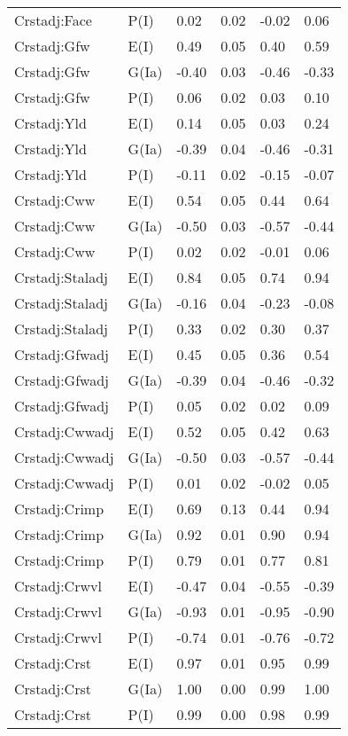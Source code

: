 \begin{center}
\begin{longtable}{|p{1.1in}|p{0.7in}|p{0.7in}|p{0.6in}|p{0.6in}|p{0.6in}|}
  Crstadj:Face & P(I) & 0.02 & 0.02 & -0.02 & 0.06 \\ 
  Crstadj:Gfw & E(I) & 0.49 & 0.05 & 0.40 & 0.59 \\ 
  Crstadj:Gfw & G(Ia) & -0.40 & 0.03 & -0.46 & -0.33 \\ 
  Crstadj:Gfw & P(I) & 0.06 & 0.02 & 0.03 & 0.10 \\ 
  Crstadj:Yld & E(I) & 0.14 & 0.05 & 0.03 & 0.24 \\ 
  Crstadj:Yld & G(Ia) & -0.39 & 0.04 & -0.46 & -0.31 \\ 
  Crstadj:Yld & P(I) & -0.11 & 0.02 & -0.15 & -0.07 \\ 
  Crstadj:Cww & E(I) & 0.54 & 0.05 & 0.44 & 0.64 \\ 
  Crstadj:Cww & G(Ia) & -0.50 & 0.03 & -0.57 & -0.44 \\ 
  Crstadj:Cww & P(I) & 0.02 & 0.02 & -0.01 & 0.06 \\ 
  Crstadj:Staladj & E(I) & 0.84 & 0.05 & 0.74 & 0.94 \\ 
  Crstadj:Staladj & G(Ia) & -0.16 & 0.04 & -0.23 & -0.08 \\ 
  Crstadj:Staladj & P(I) & 0.33 & 0.02 & 0.30 & 0.37 \\ 
  Crstadj:Gfwadj & E(I) & 0.45 & 0.05 & 0.36 & 0.54 \\ 
  Crstadj:Gfwadj & G(Ia) & -0.39 & 0.04 & -0.46 & -0.32 \\ 
  Crstadj:Gfwadj & P(I) & 0.05 & 0.02 & 0.02 & 0.09 \\ 
  Crstadj:Cwwadj & E(I) & 0.52 & 0.05 & 0.42 & 0.63 \\ 
  Crstadj:Cwwadj & G(Ia) & -0.50 & 0.03 & -0.57 & -0.44 \\ 
  Crstadj:Cwwadj & P(I) & 0.01 & 0.02 & -0.02 & 0.05 \\ 
  Crstadj:Crimp & E(I) & 0.69 & 0.13 & 0.44 & 0.94 \\ 
  Crstadj:Crimp & G(Ia) & 0.92 & 0.01 & 0.90 & 0.94 \\ 
  Crstadj:Crimp & P(I) & 0.79 & 0.01 & 0.77 & 0.81 \\ 
  Crstadj:Crwvl & E(I) & -0.47 & 0.04 & -0.55 & -0.39 \\ 
  Crstadj:Crwvl & G(Ia) & -0.93 & 0.01 & -0.95 & -0.90 \\ 
  Crstadj:Crwvl & P(I) & -0.74 & 0.01 & -0.76 & -0.72 \\ 
  Crstadj:Crst & E(I) & 0.97 & 0.01 & 0.95 & 0.99 \\ 
  Crstadj:Crst & G(Ia) & 1.00 & 0.00 & 0.99 & 1.00 \\ 
  Crstadj:Crst & P(I) & 0.99 & 0.00 & 0.98 & 0.99 \\ 

\end{longtable}
\end{center}
